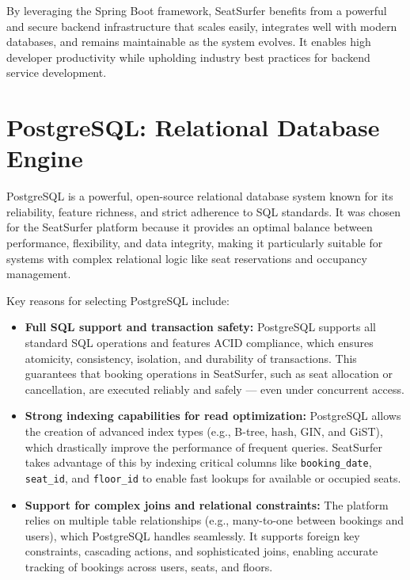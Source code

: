 \documentclass[12pt,a4paper]{report}
\begin{document}
By leveraging the Spring Boot framework, SeatSurfer benefits from a powerful and secure backend infrastructure that scales easily, integrates well with modern databases, and remains maintainable as the system evolves. It enables high developer productivity while upholding industry best practices for backend service development.

\section{PostgreSQL: Relational Database Engine}

PostgreSQL is a powerful, open-source relational database system known for its reliability, feature richness, and strict adherence to SQL standards. It was chosen for the SeatSurfer platform because it provides an optimal balance between performance, flexibility, and data integrity, making it particularly suitable for systems with complex relational logic like seat reservations and occupancy management.

Key reasons for selecting PostgreSQL include:

\begin{itemize}
    \item \textbf{Full SQL support and transaction safety:} PostgreSQL supports all standard SQL operations and features ACID compliance, which ensures atomicity, consistency, isolation, and durability of transactions. This guarantees that booking operations in SeatSurfer, such as seat allocation or cancellation, are executed reliably and safely — even under concurrent access.

    \item \textbf{Strong indexing capabilities for read optimization:} PostgreSQL allows the creation of advanced index types (e.g., B-tree, hash, GIN, and GiST), which drastically improve the performance of frequent queries. SeatSurfer takes advantage of this by indexing critical columns like \texttt{booking\_date}, \texttt{seat\_id}, and \texttt{floor\_id} to enable fast lookups for available or occupied seats.

    \item \textbf{Support for complex joins and relational constraints:} The platform relies on multiple table relationships (e.g., many-to-one between bookings and users), which PostgreSQL handles seamlessly. It supports foreign key constraints, cascading actions, and sophisticated joins, enabling accurate tracking of bookings across users, seats, and floors.
\end{itemize}
\end{document}
